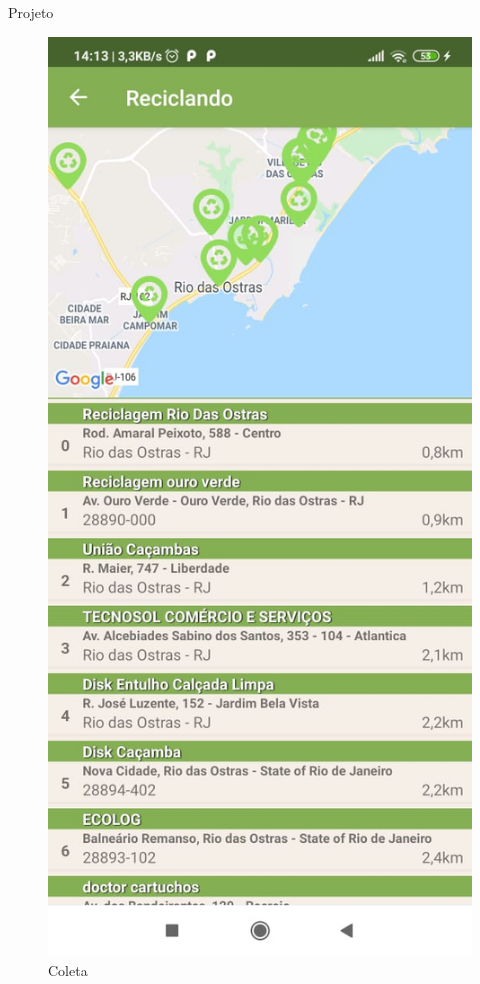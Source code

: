 \documentclass[
	12pt,				%
	openany,			%
	twoside,			%
	a4paper,			%
	english,			%
	french,				%
	spanish,			%
	brazil				%
	]{abntex2}
\begin{document}
\begin{chapter}{Projeto}
    \begin{figure}[htb]    
 \centering
  \begin{minipage}{0.45\textwidth}
    \centering
    \caption{Coleta}
    \includegraphics[scale=0.35]{media/tela_location_1.jpeg}

\end{minipage}
\end{figure}
\end{chapter}
\end{document}
